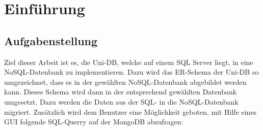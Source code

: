 \section{Einführung}

\subsection{Aufgabenstellung}
Ziel dieser Arbeit ist es, die Uni-DB, welche auf einem SQL Server liegt, in eine NoSQL-Datenbank zu implementieren. Dazu wird das ER-Schema der Uni-DB so umgezeichnet, dass es in der gewählten NoSQL-Datenbank abgebildet werden kann. Dieses Schema wird dann in der entsprechend gewählten Datenbank umgesetzt. Dazu werden die Daten aus der SQL- in die NoSQL-Datenbank migriert.
Zusätzlich wird dem Benutzer eine Möglichkeit geboten, mit Hilfe eines GUI folgende SQL-Querry auf der MongoDB abzufragen:




\newpage
